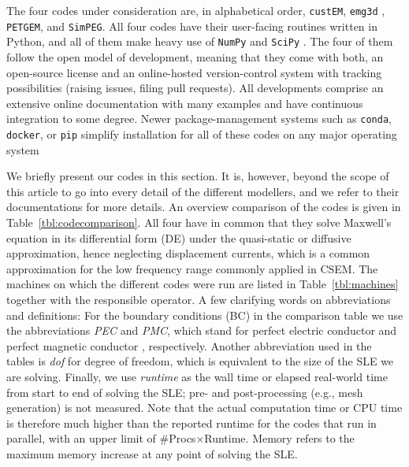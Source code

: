 \documentclass[
    paper,
  ]{geophysics}
\newcommand{\emg}[2]{\texttt{emg#1#2}\xspace}
\newcommand{\simpeg}{\texttt{SimPEG}\xspace}
\newcommand{\custem}{\texttt{custEM}\xspace}
\newcommand{\petgem}{\texttt{PETGEM}\xspace}
\begin{document}
The four codes under consideration are, in alphabetical order, \custem \citep{GEO.19.Rochlitz}, \emg3d \citep{JOSS.19.Werthmuller}, \petgem \citep{CAG.18.CastilloReyes, GJI.19.CastilloReyes}, and \simpeg \citep{CAG.15.Cockett, CAG.17.Heagy}. All four codes have their user-facing routines written in Python, and all of them make heavy use of \texttt{NumPy} \citep{NAT.20.Harris} and \texttt{SciPy} \citep{NM.20.Virtanen}. The four of them follow the open model of development, meaning that they come with both, an open-source license and an online-hosted version-control system with tracking possibilities (raising issues, filing pull requests). All developments comprise an extensive online documentation with many examples and have continuous integration to some degree. Newer package-management systems such as \texttt{conda}, \texttt{docker}, or \texttt{pip} simplify installation for all of these codes on any major operating system

We briefly present our codes in this section. It is, however, beyond the scope of this article to go into every detail of the different modellers, and we refer to their documentations for more details. An overview comparison of the codes is given in Table~\ref{tbl:codecomparison}. All four have in common that they solve Maxwell's equation in its differential form (DE) under the quasi-static or diffusive approximation, hence neglecting displacement currents, which is a common approximation for the low frequency range commonly applied in CSEM. The machines on which the different codes were run are listed in Table~\ref{tbl:machines} together with the responsible operator. A few clarifying words on abbreviations and definitions: For the boundary conditions (BC) in the comparison table we use the abbreviations \emph{PEC} and \emph{PMC}, which stand for perfect electric conductor
and perfect magnetic conductor%
, respectively. Another abbreviation used in the tables is \emph{dof} for degree of freedom, which is equivalent to the size of the SLE we are solving. Finally, we use \emph{runtime} as the wall time or elapsed real-world time from start to end of solving the SLE; pre- and post-processing (e.g., mesh generation) is not measured. Note that the actual computation time or CPU time is therefore much higher than the reported runtime for the codes that run in parallel, with an upper limit of \#Procs$\times$Runtime. Memory refers to the maximum memory increase at any point of solving the SLE.
\end{document}
